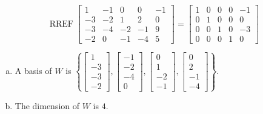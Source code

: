 \begin{exerciseAnswer} 


\[\operatorname{RREF} \left[\begin{array}{ccccc}
1 & -1 & 0 & 0 & -1 \\
-3 & -2 & 1 & 2 & 0 \\
-3 & -4 & -2 & -1 & 9 \\
-2 & 0 & -1 & -4 & 5
\end{array}\right] = \left[\begin{array}{ccccc}
1 & 0 & 0 & 0 & -1 \\
0 & 1 & 0 & 0 & 0 \\
0 & 0 & 1 & 0 & -3 \\
0 & 0 & 0 & 1 & 0
\end{array}\right] \]


\begin{enumerate}[(a)]
\item A basis of \(W\) is \( \left\{ \left[\begin{array}{c}
1 \\
-3 \\
-3 \\
-2
\end{array}\right] , \left[\begin{array}{c}
-1 \\
-2 \\
-4 \\
0
\end{array}\right] , \left[\begin{array}{c}
0 \\
1 \\
-2 \\
-1
\end{array}\right] , \left[\begin{array}{c}
0 \\
2 \\
-1 \\
-4
\end{array}\right] \right\} \).
\item The dimension of \(W\) is \( 4 \).
\end{enumerate}
    
\end{exerciseAnswer}
    
